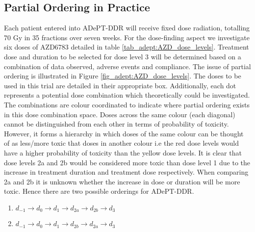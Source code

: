 \subsection{Partial Ordering in Practice}
\label{section2.3.1}%

Each patient entered into ADePT-DDR will receive fixed dose radiation, totalling 70 Gy in 35 fractions over seven weeks. For the dose-finding aspect we investigate six doses of AZD6783 detailed in table \ref{tab_adept:AZD_dose_levels}. Treatment dose and duration to be selected for dose level 3 will be determined based on a combination of data observed, adverse events and compliance. The issue of partial ordering is illustrated in Figure \ref{fig_adept:AZD_dose_levels}. The doses to be used in this trial are detailed in their appropriate box. Additionally, each dot represents a potential dose combination which theoretically could be investigated. The combinations are colour coordinated to indicate where partial ordering exists in this dose combination space. Doses across the same colour (each diagonal) cannot be distinguished from each other in terms of probability of toxicity. However, it forms a hierarchy in which doses of the same colour can be thought of as less/more toxic that doses in another colour i.e the red dose levels would have a higher probability of toxicity than the yellow dose levels. It is clear that dose levels 2a and 2b would be considered more toxic than dose level 1 due to the increase in treatment duration and treatment dose respectively. When comparing 2a and 2b it is unknown whether the increase in dose or duration will be more toxic. Hence there are two possible orderings for ADePT-DDR. 

\begin{enumerate}
	\centering
	\item $d_{-1} \rightarrow d_{0} \rightarrow d_{1} \rightarrow d_{2a} \rightarrow d_{2b} \rightarrow d_{3}$
	\item $d_{-1} \rightarrow d_{0} \rightarrow d_{1} \rightarrow d_{2b} \rightarrow d_{2a} \rightarrow d_{3}$
\end{enumerate}

